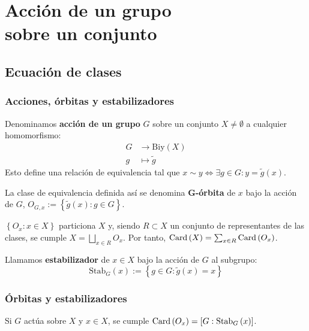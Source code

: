 \chapter{Acción de un grupo\texorpdfstring{\\}{} sobre un conjunto}
\section{Ecuación de clases}
\subsection{Acciones, órbitas y estabilizadores}
    \begin{defi}
    Denominamos \textbf{acción de un grupo} $G$ sobre un conjunto $X \neq \emptyset$ a cualquier homomorfismo:
    \begin{align*}
        G &\rightarrow \mathrm{Biy}\left( X \right)\\ 
        g &\mapsto \tilde{g}
    \end{align*}
    Esto define una relación de equivalencia tal que $x \sim y \Leftrightarrow \exists g \in G : y = \tilde{g}\left( x \right)$.

    La clase de equivalencia definida así se denomina $\mathbf{G}$\textbf{-órbita} de $x$ bajo la acción de $G$, $O_{G, x} := \left\{ \tilde{g}\left( x \right) : g \in G \right\}$.
    \end{defi}
    \begin{obs}
    $\left\{ O_x : x \in X \right\}$ particiona $X$ y, siendo $R \subset X$ un conjunto de representantes de las clases, se cumple $X = \bigsqcup_{x \in R} O_x$. Por tanto, $\operatorname{Card}\left( X \right) = \sum_{x \in R} \operatorname{Card}\left( O_x \right)$. 
    \end{obs}

    \begin{defi}
    Llamamos \textbf{estabilizador} de $x \in X$ bajo la acción de $G$ al subgrupo:
    \[
    \mathrm{Stab}_G \left( x \right) := \left\{ g \in G : \tilde{g}\left( x \right) = x \right\}
    \]
    \end{defi}

\subsection{Órbitas y estabilizadores}
    \begin{prop}
    Si $G$ actúa sobre $X$ y $x \in X$, se cumple $\operatorname{Card}\left( O_x \right) = \left[ G : \mathrm{Stab}_G\left( x \right) \right]$.
    \end{prop}

